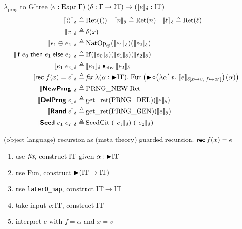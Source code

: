 \documentclass[8pt]{beamer}
\newcommand{\prng}{\mathrm{prng}}
\newcommand{\IT}{\mathrm{IT}}
\newcommand{\gRet}{\mathrm{Ret}}
\newcommand{\gFun}{\mathrm{Fun}}
\newcommand{\getret}{\mathrm{get\_ret}}
\newcommand{\cbvap}{\bullet_{\text{cbv}}}
\newcommand{\gnatop}[1]{\mathrm{NatOp}_{#1}}
\newcommand{\gif}{\mathrm{If}}
\newcommand{\recval}[3]{\syn{rec}\;#1(#2)=#3}
\begin{document}
  \begin{frame}[allowframebreaks]{\(\lambda_\prng\) to GItree}
    \((e : \iExpr\ \Gamma)\ (\senv : \Gamma \to \IT) \to (\sem{e}_\senv : \IT)\)
    \begin{align*}
      \sem{\vunit}_\senv &\eqdef \gRet(())
      \quad \sem{n}_\senv \eqdef \gRet(n)
      \quad \sem{\loc}_\senv \eqdef \gRet(\loc) \\
      \sem{x}_\senv &\eqdef \senv(x) \\
      \sem{e_1 \oplus e_2}_\senv &\eqdef \gnatop{\oplus}(\sem{e_1}_\senv)(\sem{e_2}_\senv) \\
      \sem{\syn{if}\;e_0\;\syn{then}\;e_1\;\syn{else}\;e_2}_\senv & \eqdef \gif(\sem{e_0}_\senv)(\sem{e_1}_\senv)(\sem{e_2}_\senv) \\
      \sem{\eapp{e_1}{e_2}}_\senv &\eqdef \sem{e_1}_\senv \cbvap \sem{e_2}_\senv \\
      \sem{\recval{f}{x}{\expr}}_\senv
                                  &\eqdef \fix\;\lambda (\alpha : \latert \IT).\; 
                                  \gFun\left(\latert\!\circ\!\left(\lambda \alpha'\;v.\;
                                  \sem{\expr}_{\senv[x\mapsto v,\;f\mapsto \alpha']}\right)(\alpha)\right) \\
      \sem{\kw{NewPrng}}_\senv &\eqdef \mathrm{PRNG\_NEW}\;\gRet \\
      \sem{\kw{DelPrng}\;e}_\senv &\eqdef \getret(\mathrm{PRNG\_DEL})(\sem{e}_\senv) \\
      \sem{\kw{Rand}\;e}_\senv &\eqdef \getret(\mathrm{PRNG\_GEN})(\sem{e}_\senv) \\
      \sem{\kw{Seed}\;e_1\;e_2}_\senv &\eqdef \mathrm{SeedGit}\;(\sem{e_1}_\senv)\;(\sem{e_2}_\senv)
    \end{align*}

    (object language) recursion as (meta theory) guarded recursion. \(\recval{f}{x}{e}\)
    \begin{enumerate}
      \item use \(\textit{fix}\), construct \(\IT\) given \(\alpha : \latert \IT\)
      \item use \(\gFun\), construct \(\latert (\IT \to \IT)\)
      \item use \texttt{laterO\_map}, construct \(\IT \to \IT\)
      \item take input \(v : \IT\), construct \(\IT\)
      \item interpret \(e\) with \(f = \alpha\) and \(x = v\)
    \end{enumerate}


\end{frame}
\end{document}
